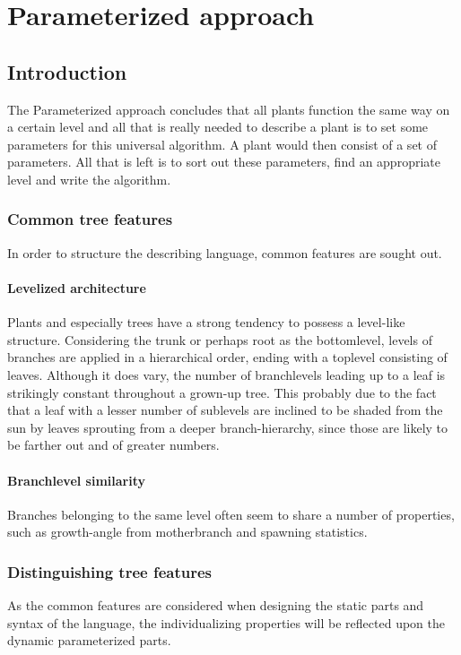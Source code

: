 \section{Parameterized approach}

\subsection{Introduction}

The Parameterized approach concludes that all plants function the same way on a
certain level and all that is really needed to describe a plant is to set some
parameters for this universal algorithm. A plant would then consist of a set
of parameters. All that is left is to sort out these parameters, find an 
appropriate level and write the algorithm.

\subsubsection{Common tree features}
In order to structure the describing language, common features are sought out.

\paragraph{Levelized architecture}
Plants and especially trees have a strong tendency to possess a level-like
structure. Considering the trunk or perhaps root as the bottomlevel, levels
of branches are applied in a hierarchical order, ending with a toplevel
consisting of leaves. Although it does vary, the number of branchlevels
leading up to a leaf is strikingly constant throughout a grown-up tree. This
probably due to the fact that a leaf with a lesser number of sublevels are
inclined to be shaded from the sun by leaves sprouting from a deeper
branch-hierarchy, since those are likely to be farther out and of greater 
numbers. 

\paragraph{Branchlevel similarity}
Branches belonging to the same level often seem to share a number of
properties, such as growth-angle from motherbranch and spawning statistics. 

\subsubsection{Distinguishing tree features}
As the common features are considered when designing the static parts and syntax of the 
language, the individualizing properties will be reflected upon the dynamic
parameterized parts.

